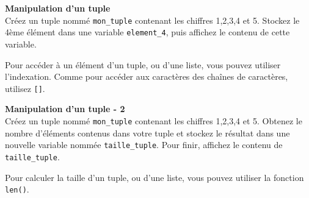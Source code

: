    \begin{Exercice}[5 minutes] \textbf{Manipulation d'un tuple}\\
        Créez un tuple nommé \lstinline{mon_tuple} contenant les chiffres 1,2,3,4 et 5. Stockez le 4ème élément dans une variable \lstinline{element_4}, puis affichez le contenu de cette variable.
    
        \begin{conseil}
            Pour accéder à un élément d'un tuple, ou d'une liste, vous pouvez utiliser l'indexation. Comme pour accéder aux caractères des chaînes de caractères, utilisez \lstinline{[]}.
        \end{conseil}
        
        \begin{solution}
             
        \end{solution}
    \end{Exercice}

    \begin{Exercice}[5 minutes] \textbf{Manipulation d'un tuple - 2}\\
        Créez un tuple nommé \lstinline{mon_tuple} contenant les chiffres 1,2,3,4 et 5. Obtenez le nombre d'éléments contenus dans votre tuple et stockez le résultat dans une nouvelle variable nommée \lstinline{taille_tuple}. Pour finir, affichez le contenu de \lstinline{taille_tuple}.
    
        \begin{conseil}
            Pour calculer la taille d'un tuple, ou d'une liste, vous pouvez utiliser la fonction \lstinline{len()}.
        \end{conseil}
        
        \begin{solution}
             
        \end{solution}
    \end{Exercice}
    

